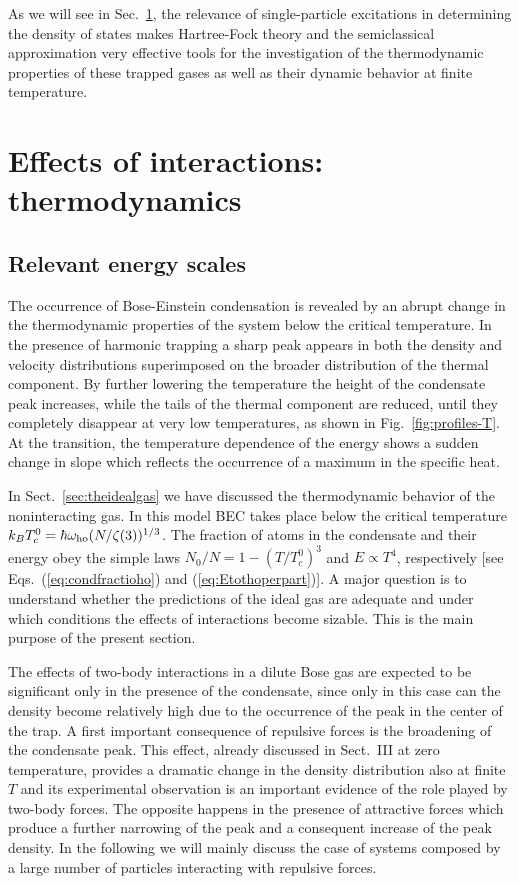 As we will see in Sec.~\ref{sec:thermodynamics}, the relevance 
of single-particle excitations in determining the density of states 
makes Hartree-Fock theory and the semiclassical approximation very 
effective tools for the investigation of the thermodynamic properties 
of these trapped gases as well as their dynamic behavior at finite 
temperature. 



\section{Effects of interactions: thermodynamics}
\label{sec:thermodynamics}

\subsection{Relevant energy scales}
\label{sec:therm1}

The occurrence of Bose-Einstein condensation is revealed  by an  abrupt
change  in the thermodynamic properties of the system below the critical
temperature. In the presence of harmonic trapping a sharp peak 
appears in both the density and velocity  distributions superimposed
on the broader distribution of the thermal component. By further lowering
the temperature the height of the condensate peak increases, while the 
tails of the thermal component are reduced, until they completely 
disappear at very low temperatures, as shown in Fig.~\ref{fig:profiles-T}.  
At the transition, the temperature dependence of the energy shows a 
sudden change in slope which reflects the occurrence of a maximum in the 
specific heat.   

In Sect.~\ref{sec:theidealgas} we have discussed the thermodynamic behavior
of the noninteracting gas. In this model BEC takes
place below the critical temperature $k_BT_c^0 = \hbar\omega_{\rm ho}
(N/\zeta(3))^{1/3}$.  The fraction of atoms in the condensate and their
energy obey the simple laws $N_0/N=1-(T/T_c^0)^3$ and
$E\propto T^4$, respectively [see Eqs.~(\ref{eq:condfractioho}) and
(\ref{eq:Etothoperpart})]. A major question is to understand
whether the predictions of the ideal gas are adequate and under which
conditions the effects of interactions become sizable. This is
the main purpose of the present section.

The effects of two-body interactions in a dilute Bose gas are
expected to be significant only in the presence of the condensate,
since only in this case can the density become relatively high due
to the occurrence of the peak  in the center of the trap. A first
important consequence of repulsive forces is the broadening
of the condensate peak. This effect, already discussed in Sect.~III
at zero temperature, provides a dramatic change in the density distribution
also at finite $T$ and its  experimental observation is an important
evidence of the role played by two-body forces. The opposite happens in the
presence of attractive forces which produce a further narrowing
of the  peak and a consequent increase of the peak density. 
In the following we will mainly discuss the case of systems composed by
a large number of particles interacting with repulsive forces.

